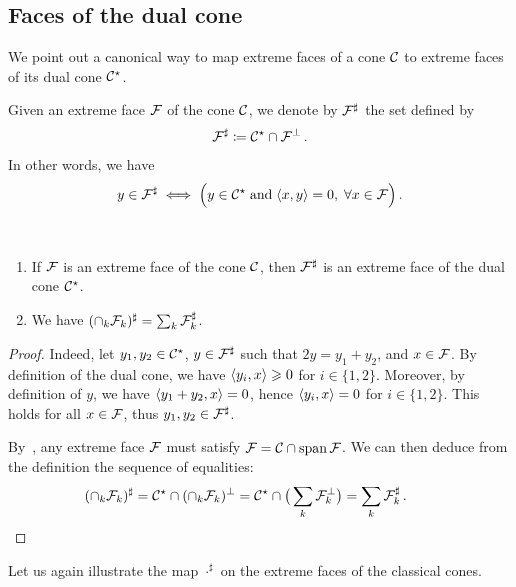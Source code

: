 \documentclass[main]{subfiles}
\begin{document}
\subsection{Faces of the dual cone}

We point out a  canonical way to map extreme faces of a cone $\mathcal{C}$ to extreme faces of its dual cone $\mathcal{C}^\star$.
\begin{definition}
Given an extreme face $\mathcal{F}$ of the cone $\mathcal{C}$, we denote by $\mathcal{F}^\sharp$ the set defined by
\begin{align*}
\mathcal{F}^\sharp \coloneqq \mathcal{C}^\star \cap \mathcal{F}^\perp \,.
\end{align*}
In other words, we have
\begin{align*}
y \in \mathcal{F}^\sharp \iff 
\Big(
y \in \mathcal{C}^\star \;\text{and}\;\langle { x } , { y } \rangle = 0, \; \forall x \in \mathcal{F}
\Big) \,.
\end{align*}
\end{definition}


\begin{lemma}
\label{lem:dual_face_prop}
~
\begin{enumerate}
\item If $\mathcal{F}$ is an extreme face of the cone $\mathcal{C}$, then $\mathcal{F}^\sharp$ is an extreme face of the dual cone $\mathcal{C}^\star$.
\item We have $( \cap_k \mathcal{F}_k )^\sharp = \sum_k \mathcal{F}_k^\sharp$.
\end{enumerate}
\end{lemma}
\begin{proof}
Indeed, let $y_1, y_2 \in \mathcal{C}^\star$, $y \in \mathcal{F}^\sharp$ such that $2y = y_1 + y_2$, and $x \in \mathcal{F}$. By definition of the dual cone, we have $\langle {y_i } , { x} \rangle \geqslant 0$ for $i\in\{1,2\}$. Moreover, by definition of $y$, we have $\langle {y_1 + y_2 } , {x} \rangle = 0$, hence $\langle {y_i } , { x} \rangle = 0$  for $i\in\{1,2\}$. This holds for all $x \in \mathcal{F}$, thus $y_1, y_2 \in \mathcal{F}^\sharp$.

By~, any extreme face $\mathcal{F}$ must satisfy $\mathcal{F} = \mathcal{C} \cap \operatorname{span} \mathcal{F}$.
We can then deduce from the definition the sequence of equalities:
\begin{align*}
( \cap_k \F_k )^\sharp = \Cone^\dual \cap (\cap_k \F_k)^\perp = \Cone^\dual \cap \big( \sum_k \F_k ^\perp \big) = \sum_k \F_k^\sharp \,. \qquad\hfill \qedhere
\end{align*}
\end{proof}



Let us again illustrate the map $\cdot^\sharp$ on the extreme faces of the classical cones.
\end{document}
